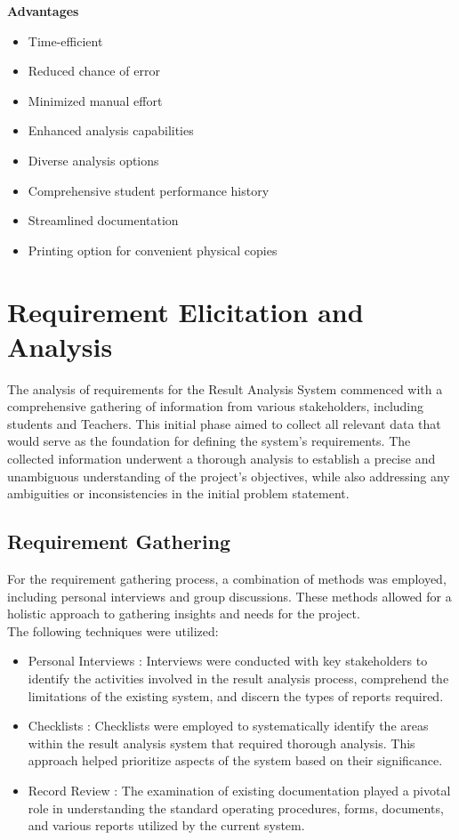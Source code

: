 \documentclass{nascproject}
\begin{document}
\textbf{Advantages}
\begin{itemize}
	\item Time-efficient
	\item Reduced chance of error
	\item Minimized manual effort
	\item Enhanced analysis capabilities
	\item Diverse analysis options
	\item Comprehensive student performance history
	\item Streamlined documentation
	\item Printing option for convenient physical copies
\end{itemize}
\section{Requirement Elicitation and Analysis}
The analysis of requirements for the Result Analysis System commenced with a comprehensive gathering of information from various stakeholders, including students and Teachers. This initial phase aimed to collect all relevant data that would serve as the foundation for defining the system's requirements. The collected information underwent a thorough analysis to establish a precise and unambiguous understanding of the project's objectives, while also addressing any ambiguities or inconsistencies in the initial problem statement.
\subsection{Requirement Gathering}
For the requirement gathering process, a combination of methods was employed, including personal interviews and group discussions. These methods allowed for a holistic approach to gathering insights and needs for the project.\\
The following techniques were utilized:
\begin{itemize}
	\item Personal Interviews : Interviews were conducted with key stakeholders to identify the activities involved in the result analysis process, comprehend the limitations of the existing system, and discern the types of reports required.
	\item Checklists : Checklists were employed to systematically identify the areas within the result analysis system that required thorough analysis. This approach helped prioritize aspects of the system based on their significance. 
	\item Record Review : The examination of existing documentation played a pivotal role in understanding the standard operating procedures, forms, documents, and various reports utilized by the current system.
\end{itemize}
\end{document}
